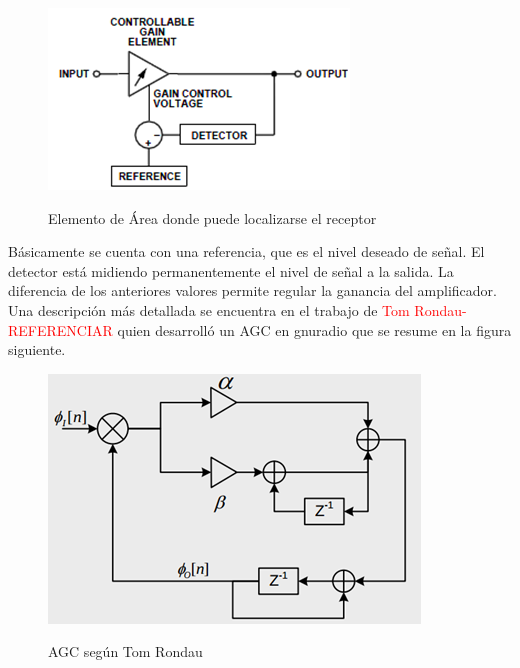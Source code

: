 \vspace{200px}
\begin{figure}[h!]
	\captionsetup{justification = raggedright, singlelinecheck = false}
	\caption{Elemento de Área donde puede localizarse el receptor} 
	\centering
	\includegraphics[scale=1]{Imagenes/PLL.png}
	\label{fig:PLL}
\end{figure}

Básicamente se cuenta con una referencia, que es el nivel deseado de señal. El detector está midiendo permanentemente el nivel de señal a la salida. La diferencia de los anteriores valores permite regular la ganancia del amplificador. Una descripción más detallada se encuentra en el trabajo de \textcolor{red}{Tom Rondau- REFERENCIAR} quien desarrolló un AGC en gnuradio que se resume en la figura siguiente. \\

\begin{figure}[h!]
	\captionsetup{justification = raggedright, singlelinecheck = false}
	\caption{AGC según Tom Rondau} 
	\centering
	\includegraphics[scale=1]{Imagenes/AGC.png}
	\label{fig:AGC}
\end{figure}

